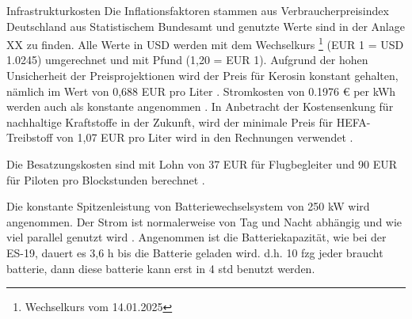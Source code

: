 
Infrastrukturkosten
%
Die Inflationsfaktoren stammen aus Verbraucherpreisindex Deutschland aus Statistischem Bundesamt und genutzte Werte sind in der Anlage XX zu finden.
Alle Werte in USD werden mit dem Wechselkurs \footnote{Wechselkurs vom 14.01.2025} (EUR 1 = USD 1.0245) umgerechnet und mit Pfund (1,20 = EUR 1).
Aufgrund der hohen Unsicherheit der Preisprojektionen wird der Preis für Kerosin konstant gehalten, nämlich im Wert von
0,688 EUR pro Liter \cite{iata_industry_statistics_2024}. Stromkosten von 0.1976 € per kWh werden auch als konstante angenommen \cite{eurostat_nrg_pc_205}.
In Anbetracht der Kostensenkung für nachhaltige Kraftstoffe in der Zukunft, wird der minimale Preis für HEFA-Treibstoff 
von 1,07 EUR pro Liter wird in den Rechnungen verwendet \cite{watson2024sustainable}.









Die Besatzungskosten sind mit Lohn von 37 EUR für Flugbegleiter und 90 EUR für Piloten pro Blockstunden berechnet \cite{discover_airlines_cabin}.

Die konstante Spitzenleistung von Batteriewechselsystem von 250 kW wird angenommen. Der Strom ist normalerweise von Tag und Nacht abhängig
und wie viel parallel genutzt wird \cite{salucci2020optimal}. Angenommen ist die Batteriekapazität, wie bei der ES-19, dauert es 3,6 h bis die Batterie geladen wird.
d.h. 10 fzg jeder braucht batterie, dann diese batterie kann erst in 4 std benutzt werden.